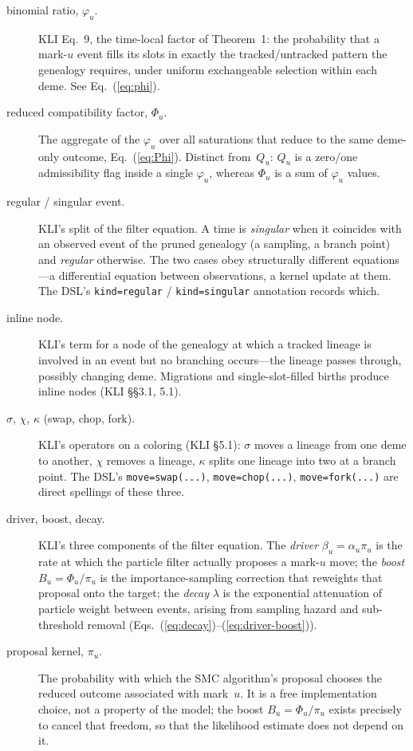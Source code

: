 \documentclass[11pt,leqno]{article}
\newcommand{\code}[1]{\texttt{#1}}
\theoremstyle{plain}
\theoremstyle{definition}
\begin{document}
\begin{description}
\item[binomial ratio, $\varphi_u$.]  KLI Eq.~9, the time-local factor of
  Theorem~1: the probability that a mark-$u$ event fills its slots in
  exactly the tracked/untracked pattern the genealogy requires, under
  uniform exchangeable selection within each deme.  See
  Eq.~(\ref{eq:phi}).

\item[reduced compatibility factor, $\Phi_u$.]  The aggregate of the
  $\varphi_u$ over all saturations that reduce to the same deme-only
  outcome, Eq.~(\ref{eq:Phi}).  Distinct from~$Q_u$: $Q_u$ is a
  zero/one admissibility flag inside a single $\varphi_u$, whereas $\Phi_u$
  is a sum of $\varphi_u$ values.

\item[regular / singular event.]  KLI's split of the filter equation.  A
  time is \emph{singular} when it coincides with an observed event of the
  pruned genealogy (a sampling, a branch point) and \emph{regular}
  otherwise.  The two cases obey structurally different equations---a
  differential equation between observations, a kernel update at them.
  The DSL's \code{kind=regular} / \code{kind=singular} annotation records
  which.

\item[inline node.]  KLI's term for a node of the genealogy at which a
  tracked lineage is involved in an event but no branching occurs---the
  lineage passes through, possibly changing deme.  Migrations and
  single-slot-filled births produce inline nodes (KLI \S\S3.1, 5.1).

\item[$\sigma$, $\chi$, $\kappa$ (swap, chop, fork).]  KLI's operators on a
  coloring (KLI \S5.1): $\sigma$ moves a lineage from one deme to another,
  $\chi$ removes a lineage, $\kappa$ splits one lineage into two at a branch
  point.  The DSL's \code{move=swap(...)}, \code{move=chop(...)},
  \code{move=fork(...)} are direct spellings of these three.

\item[driver, boost, decay.]  KLI's three components of the filter
  equation.  The \emph{driver} $\beta_u = \alpha_u \pi_u$ is the rate at
  which the particle filter actually proposes a mark-$u$ move; the
  \emph{boost} $B_u = \Phi_u / \pi_u$ is the importance-sampling correction
  that reweights that proposal onto the target; the \emph{decay} $\lambda$
  is the exponential attenuation of particle weight between events, arising
  from sampling hazard and sub-threshold removal
  (Eqs.~(\ref{eq:decay})--(\ref{eq:driver-boost})).

\item[proposal kernel, $\pi_u$.]  The probability with which the SMC
  algorithm's proposal chooses the reduced outcome associated with
  mark~$u$.  It is a free implementation choice, not a property of the
  model; the boost $B_u = \Phi_u/\pi_u$ exists precisely to cancel that
  freedom, so that the likelihood estimate does not depend on it.

\end{description}
\end{document}
